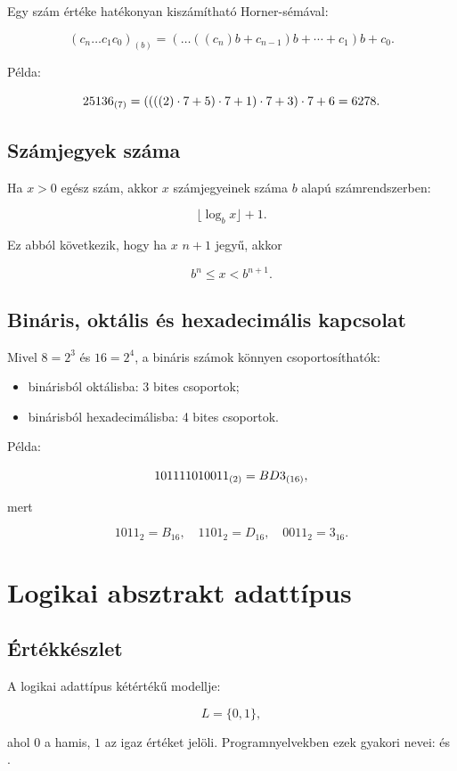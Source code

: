 Egy szám értéke hatékonyan kiszámítható Horner-sémával:

\[
(c_n\ldots c_1c_0)_{(b)}=(\ldots((c_n)b+c_{n-1})b+\cdots+c_1)b+c_0.
\]

Példa:

\[
25136_{(7)}=((((2)\cdot7+5)\cdot7+1)\cdot7+3)\cdot7+6=6278.
\]

\subsection{Számjegyek száma}

Ha $x>0$ egész szám, akkor $x$ számjegyeinek száma $b$ alapú számrendszerben:

\[
\lfloor\log_b x\rfloor+1.
\]

Ez abból következik, hogy ha $x$ $n+1$ jegyű, akkor

\[
b^n\leq x<b^{n+1}.
\]

\subsection{Bináris, oktális és hexadecimális kapcsolat}

Mivel $8=2^3$ és $16=2^4$, a bináris számok könnyen csoportosíthatók:

\begin{itemize}
  \item binárisból oktálisba: 3 bites csoportok;
  \item binárisból hexadecimálisba: 4 bites csoportok.
\end{itemize}

Példa:

\[
101111010011_{(2)}=BD3_{(16)},
\]

mert

\[
1011_2=B_{16},\quad 1101_2=D_{16},\quad 0011_2=3_{16}.
\]

\section{Logikai absztrakt adattípus}

\subsection{Értékkészlet}

A logikai adattípus kétértékű modellje:

\[
L=\{0,1\},
\]

ahol $0$ a hamis, $1$ az igaz értéket jelöli. Programnyelvekben ezek gyakori nevei:  és .

